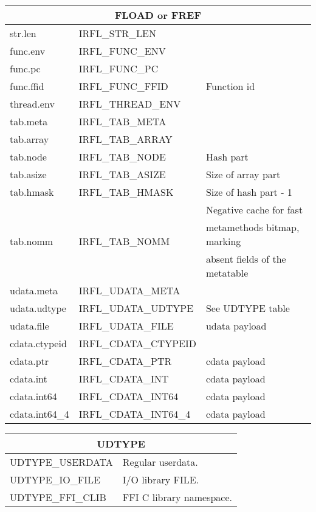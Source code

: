 \begin{table}
\centering
\begin{tabular}{|l|l|l|}
\hline
\multicolumn{3}{|c|}{FLOAD or FREF}\\\hline
str.len        & IRFL\_STR\_LEN        & \\
func.env       & IRFL\_FUNC\_ENV       & \\
func.pc        & IRFL\_FUNC\_PC        & \\
func.ffid      & IRFL\_FUNC\_FFID      & Function id\\
thread.env     & IRFL\_THREAD\_ENV     & \\
tab.meta       & IRFL\_TAB\_META       & \\
tab.array      & IRFL\_TAB\_ARRAY      & \\
tab.node       & IRFL\_TAB\_NODE       & Hash part\\
tab.asize      & IRFL\_TAB\_ASIZE      & Size of array part\\
tab.hmask      & IRFL\_TAB\_HMASK      & Size of hash part - 1\\
\multirow{3}{*}{tab.nomm} & \multirow{3}{*}{IRFL\_TAB\_NOMM} & Negative cache for fast \\
& & metamethods bitmap, marking\\
& & absent fields of the metatable\\
udata.meta     & IRFL\_UDATA\_META     & \\
udata.udtype   & IRFL\_UDATA\_UDTYPE   & See UDTYPE table\\
udata.file     & IRFL\_UDATA\_FILE     & udata payload \\
cdata.ctypeid  & IRFL\_CDATA\_CTYPEID  & \\
cdata.ptr      & IRFL\_CDATA\_PTR      & cdata payload \\
cdata.int      & IRFL\_CDATA\_INT      & cdata payload \\
cdata.int64    & IRFL\_CDATA\_INT64    & cdata payload \\
cdata.int64\_4 & IRFL\_CDATA\_INT64\_4 & cdata payload \\
\hline
\end{tabular}
\end{table}
\begin{table}
\centering
\begin{tabular}{|l|l|}
\hline
\multicolumn{2}{|c|}{UDTYPE}\\\hline
UDTYPE\_USERDATA  & Regular userdata.\\
UDTYPE\_IO\_FILE  & I/O library FILE.\\
UDTYPE\_FFI\_CLIB & FFI C library namespace.\\\hline
\end{tabular}
\end{table}
